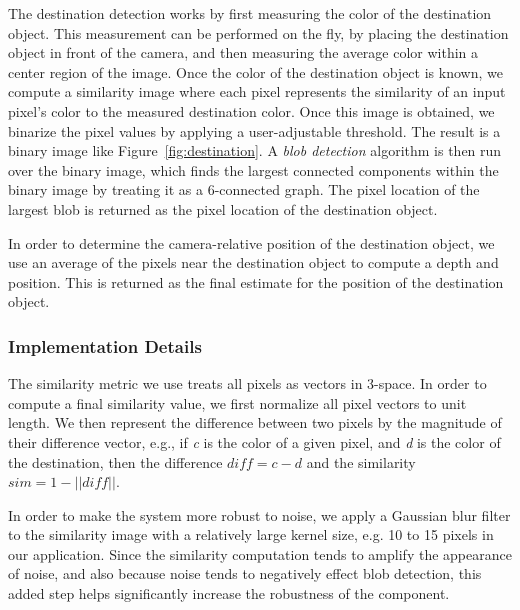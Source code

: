 The destination detection works by first measuring the color of the destination
object. This measurement can be performed on the fly, by placing the
destination object in front of the camera, and then measuring the average 
color within a center region of the image. Once the color of the destination 
object is known, we compute a similarity image where each pixel represents the 
similarity of an input pixel's color to the measured destination color. Once 
this image is obtained, we binarize the pixel values by applying a 
user-adjustable threshold. The result is a binary image like
Figure~\ref{fig:destination}. A \emph{blob detection} algorithm is then run over the 
binary image, which finds the largest connected components within the binary 
image by treating it as a 6-connected graph. The pixel location of the largest 
blob is returned as the pixel location of the destination object.

In order to determine the camera-relative position of the destination object,
we use an average of the pixels near the destination object to compute
a depth and position. This is returned as the final estimate for the
position of the destination object. 

\subsubsection{Implementation Details}
\label{sec:technical-dest-impl}

The similarity metric we use treats all pixels as vectors in 3-space. In order
to compute a final similarity value, we first normalize all pixel vectors
to unit length. We then represent the difference between two pixels by the
magnitude of their difference vector, e.g., if \emph{c} is the color of a
given pixel, and \emph{d} is the color of the destination, then the difference
\begin{math} \textit{diff} = c - d \end{math} and the similarity \begin{math}
\textit{sim} = 1 - ||\textit{diff}|| \end{math}.

In order to make the system more robust to noise, we apply a Gaussian blur
filter to the similarity image with a relatively large kernel size, e.g.
10 to 15 pixels in our application. Since the similarity computation tends
to amplify the appearance of noise, and also because noise tends to
negatively effect blob detection, this added step helps significantly increase
the robustness of the component.


